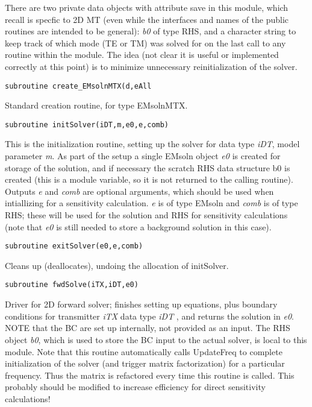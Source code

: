 \documentclass[12pt]{article}
\begin{document}
There are two private data objects with attribute save
in this module, which recall is specfic to 2D MT (even
while the interfaces and names of the public routines
are intended to be general): 
{\it b0} of type RHS, and a character string to
keep track of which mode (TE or TM) was solved for
on the last call to any routine within the module.
The idea (not clear it is useful or implemented correctly
at this point) is to minimize unnecessary reinitialization of
the solver.

\begin{verbatim}
subroutine create_EMsolnMTX(d,eAll
\end{verbatim}

Standard creation routine, for type EMsolnMTX.

\begin{verbatim}
subroutine initSolver(iDT,m,e0,e,comb)
\end{verbatim}

This is the initialization routine, setting up the
solver for data type {\it iDT}, model parameter {\it m}.  As part
of the setup a single EMsoln object {\it e0} is created for storage
of the solution, and if necessary the scratch RHS data structure
b0 is created (this is a module variable, 
so it is not returned to the calling routine).
Outputs {\it e} and {\it comb} are optional
arguments, which should be used when intiallizing
for a sensitivity calculation.   {\it e} is of type EMsoln and {\it comb}
is of type RHS; these will be used for the solution and RHS
for sensitivity calculations (note that {\it e0} is still needed
to store a background solution in this case).

\begin{verbatim}
subroutine exitSolver(e0,e,comb)
\end{verbatim}

Cleans up (deallocates), undoing the allocation of initSolver.

\begin{verbatim}
subroutine fwdSolve(iTX,iDT,e0)
\end{verbatim}

Driver for 2D forward solver; finishes setting up equations,
plus boundary conditions for transmitter {\it iTX}
data type {\it iDT} , and returns
the solution in {\it e0}.   NOTE that the BC are set up internally,
not provided as an input.  The RHS object {\it b0}, 
which is used to store the BC input to the actual solver,
is local to this module.
Note that this routine automatically calls UpdateFreq to complete
initialization of the solver (and trigger matrix factorization)
for a particular frequency.  Thus the matrix is refactored every
time this routine is called.  This probably should be modified to increase
efficiency for direct sensitivity calculations!
\end{document}
